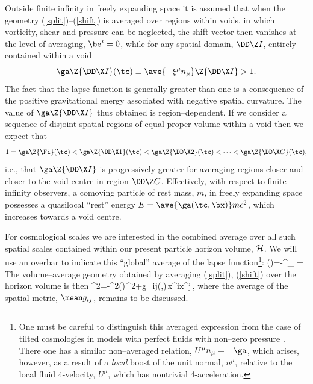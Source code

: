 \documentclass[12pt]{iopart}
\begin{document}
Outside finite infinity in freely expanding space it is assumed that
when the geometry (\ref{split})--(\ref{shift}) is averaged over regions
within voids, in which vorticity, shear and pressure can be neglected,
the shift vector then vanishes at the level of averaging,
$\be^i=0$, while for any spatial domain, $\DD\Z I$, entirely contained within
a void
$$\ga\Z{\DD\X I}(\tc)\equiv\ave{-\xi^\mu n_\mu}\Z{\DD\X I}>1.$$
The fact that the lapse function is generally greater than one is a consequence
of the positive gravitational energy associated with negative spatial
curvature. The value of $\ga\Z{\DD\X I}$ thus obtained is region--dependent.
If we consider a sequence of disjoint spatial regions of equal proper volume
within a void then we expect that
$$1= \ga\Z{\Fi}(\tc)<\ga\Z{\DD\X 1}(\tc)<\ga\Z{\DD\X 2}(\tc)<\cdots
<\ga\Z{\DD\X C}(\tc),$$
i.e., that $\ga\Z{\DD\X I}$ is progressively greater for averaging
regions closer and closer to the void centre in region $\DD\Z C$.
Effectively, with respect to finite infinity observers, a comoving particle
of rest mass, $m$, in freely expanding space possesses a quasilocal
``rest'' energy $E=\ave{\ga(\tc,\bx)}mc^2$, which increases towards a
void centre.

For cosmological scales we are interested in the combined average
over all such spatial scales contained within our present
particle horizon volume, $\cal H$. We will use an overbar to indicate this
``global'' average of the lapse function\footnote{One must be careful to
distinguish this averaged expression from the case of tilted cosmologies in
models with perfect fluids with non--zero pressure \cite{KE}. There one has a
similar non--averaged relation, $U^\mu n_\mu=-\ga$, which arises, however,
as a result of a {\em local} boost of the unit normal, $n^\mu$,
relative to the local fluid 4-velocity, $U^\mu$, which has
nontrivial 4-acceleration.}:
\beq \gb(\tc)\equiv\ave{\ga(\tc,\bx)}=-\xi^\mu\bn_\mu
=
\label{gab}\eeq
The volume--average geometry obtained by averaging
(\ref{split}), (\ref{shift}) over the horizon volume is then
\beq
\ds^2=-\gb^2(\tc)\,\dd\tc^2+\mean g_{ij}(\tc,\bx)\,\dd x^i\dd x^j\,,
\label{geom}\eeq
where the average of the spatial metric, $\mean g_{ij}$, remains to be
discussed.
\end{document}
